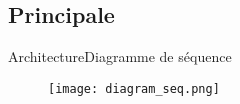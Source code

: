 \subsection{Principale}
\begin{frame}{Architecture}{Diagramme de séquence}
    \begin{figure}
         \centering
        \texttt{[image: diagram\_seq.png]}
        \label{fig:my_label}
    \end{figure}

\end{frame}
